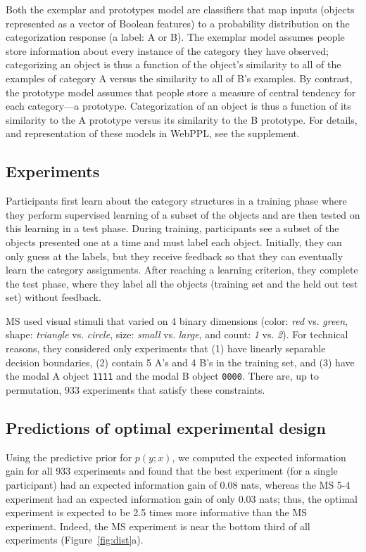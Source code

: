\documentclass{article}
\begin{document}
Both the exemplar and prototypes model are classifiers that map inputs (objects represented as a vector of Boolean features) to a probability distribution on the categorization response (a label: A or B).
The exemplar model assumes people store information about every instance of the category they have observed; categorizing an object is thus a function of the object's similarity to all of the examples of category A versus the similarity to all of B's examples.
By contrast, the prototype model assumes that people store a measure of central tendency for each category---a prototype.
Categorization of an object is thus a function of its similarity to the A prototype versus its similarity to the B prototype.
For details, and representation of these models in WebPPL, see the supplement.

\subsection{Experiments}

Participants first learn about the category structures in a training phase where they perform supervised learning of a subset of the objects and are then tested on this learning in a test phase.
During training, participants see a subset of the objects presented one at a time and must label each object.
Initially, they can only guess at the labels, but they receive feedback so that they can eventually learn the category assignments.
After reaching a learning criterion, they complete the test phase, where they label all the objects (training set and the held out test set) without feedback.

MS used visual stimuli that varied on 4 binary dimensions (color: \emph{red} vs. \emph{green}, shape: \emph{triangle} vs. \emph{circle}, size: \emph{small} vs. \emph{large}, and count: \emph{1} vs. \emph{2}).
For technical reasons, they considered only experiments that (1) have linearly separable decision boundaries, (2) contain 5 A's and 4 B's in the training set, and (3) have the modal A object \lstinline{1111} and the modal B object \lstinline{0000}.
There are, up to permutation, 933 experiments that satisfy these constraints.

\subsection{Predictions of optimal experimental design}

Using the predictive prior for $p(y; x)$, we computed the expected information gain for all 933 experiments and found that the best experiment (for a single participant) had an expected information gain of 0.08 nats, whereas the MS 5-4 experiment had an expected information gain of only 0.03 nats; thus, the optimal experiment is expected to be 2.5 times more informative than the MS experiment.
Indeed, the MS experiment is near the bottom third of all experiments (Figure~\ref{fig:dist}a).
\end{document}
